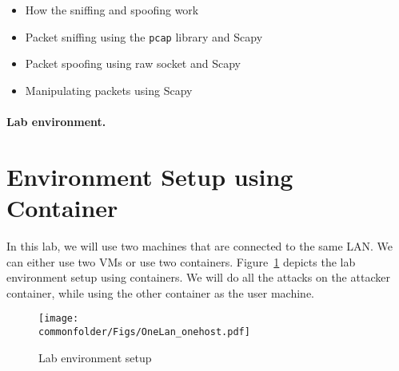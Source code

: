 \begin{itemize}[noitemsep]
\item How the sniffing and spoofing work
\item Packet sniffing using the {\tt pcap} library and Scapy
\item Packet spoofing using raw socket and Scapy
\item Manipulating packets using Scapy 
\end{itemize}


\paragraph{Lab environment.} \seedenvironmentC




\section{Environment Setup using Container} 

In this lab, we will use two machines that are connected
to the same LAN. We can either use two VMs or use two containers. 
Figure~\ref{fig:labsetup} depicts the lab environment setup using 
containers.
We will do all the attacks on the attacker container, while using
the other container as the user machine. 


\begin{figure}[htb]
\begin{center}
\texttt{[image: \\commonfolder/Figs/OneLan\_onehost.pdf]}
\end{center}
\caption{Lab environment setup}
\label{fig:labsetup}
\end{figure}
 

%
 


